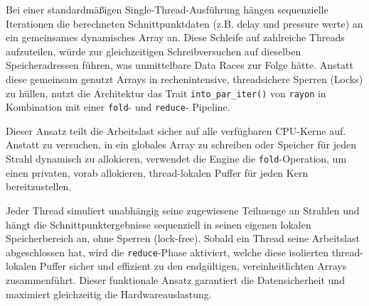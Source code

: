 \documentclass{article}
\begin{document}
    Bei einer standardmäßigen Single-Thread-Ausführung hängen sequenzielle Iterationen die berechneten Schnittpunktdaten (z.B. delay und pressure werte) an ein gemeinsames dynamisches Array an.
    Diese Schleife auf zahlreiche Threads aufzuteilen, würde zur gleichzeitigen Schreibversuchen auf dieselben Speicheradressen führen, was unmittelbare Data Races zur Folge hätte.
    Anstatt diese gemeinsam genutzt Arrays in rechenintensive, threadsichere Sperren (Locks) zu hüllen, nutzt die Architektur das Trait \texttt{into\_par\_iter()} von \texttt{rayon} in
    Kombination mit einer \texttt{fold}- und \texttt{reduce}- Pipeline.

    Dieser Ansatz teilt die Arbeitslast sicher auf alle verfügbaren CPU-Kerne auf.
    Anstatt zu versuchen, in ein globales Array zu schreiben oder Speicher für jeden Strahl
    dynamisch zu allokieren, verwendet die Engine die \texttt{fold}-Operation, um einen privaten, vorab allokieren, thread-lokalen Puffer für jeden Kern bereitzustellen.

    Jeder Thread simuliert unabhängig seine zugewiesene Teilmenge an Strahlen und hängt die Schnittpunktergebnisse sequenziell in seinen eigenen lokalen Speicherbereich an, ohne Sperren (lock-free).
    Sobald ein Thread seine Arbeitslast abgeschlossen hat, wird die \texttt{reduce}-Phase aktiviert, welche diese isolierten thread-lokalen Puffer sicher und effizient zu den endgültigen,
    vereinheitlichten Arrays zusammenführt.
    Dieser funktionale Ansatz garantiert die Datensicherheit und maximiert gleichzeitig die Hardwareauslastung.


\end{document}

